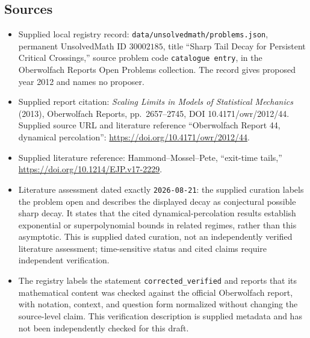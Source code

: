 \documentclass[11pt]{article}
\begin{document}
\subsection{Sources}
\begin{itemize}
\item Supplied local registry record: \texttt{data/unsolvedmath/problems.json}, permanent UnsolvedMath ID \(30002185\), title ``Sharp Tail Decay for Persistent Critical Crossings,'' source problem code \texttt{catalogue entry}, in the Oberwolfach Reports Open Problems collection. The record gives proposed year 2012 and names no proposer.
\item Supplied report citation: \emph{Scaling Limits in Models of Statistical Mechanics} (2013), Oberwolfach Reports, pp.\ 2657--2745, DOI 10.4171/owr/2012/44. Supplied source URL and literature reference ``Oberwolfach Report 44, dynamical percolation'': \url{https://doi.org/10.4171/owr/2012/44}.
\item Supplied literature reference: Hammond--Mossel--Pete, ``exit-time tails,'' \url{https://doi.org/10.1214/EJP.v17-2229}.
\item Literature assessment dated exactly \texttt{2026-08-21}: the supplied curation labels the problem open and describes the displayed decay as conjectural possible sharp decay. It states that the cited dynamical-percolation results establish exponential or superpolynomial bounds in related regimes, rather than this asymptotic. This is supplied dated curation, not an independently verified literature assessment; time-sensitive status and cited claims require independent verification.
\item The registry labels the statement \texttt{corrected\_verified} and reports that its mathematical content was checked against the official Oberwolfach report, with notation, context, and question form normalized without changing the source-level claim. This verification description is supplied metadata and has not been independently checked for this draft.
\end{itemize}
\end{document}
